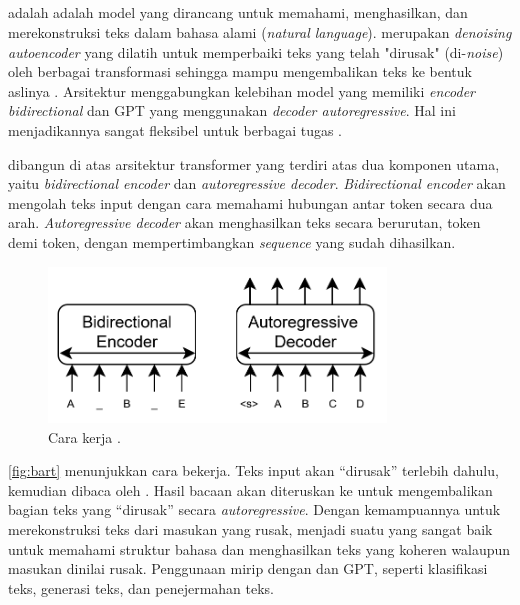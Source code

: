 \subsection{\bartfull}
\label{subsec:bart}

\bartfull adalah adalah model \ml{} yang dirancang untuk memahami, menghasilkan, dan merekonstruksi teks dalam bahasa alami (\emph{natural language}). \bart{} merupakan \emph{denoising autoencoder} yang dilatih untuk memperbaiki teks yang telah "dirusak" (di-\emph{noise}) oleh berbagai transformasi sehingga mampu mengembalikan teks ke bentuk aslinya \parencite{lewis2019bart}. Arsitektur \bart{} menggabungkan kelebihan model \bert{} yang memiliki \emph{encoder bidirectional} dan GPT yang menggunakan \emph{decoder autoregressive}. Hal ini menjadikannya sangat fleksibel untuk berbagai tugas \nlpfull.

\bart{} dibangun di atas arsitektur transformer yang terdiri atas dua 
komponen utama, yaitu \emph{bidirectional encoder} dan \textit{autoregressive decoder}. 
\emph{Bidirectional encoder} akan mengolah teks input dengan cara memahami hubungan antar token secara dua arah. \emph{Autoregressive decoder} akan menghasilkan teks secara berurutan, token demi token, dengan mempertimbangkan \emph{sequence} yang sudah dihasilkan.

\pagebreak

\begin{figure}
\centering
\includegraphics[width=0.8\textwidth]{images/bart.png}
\caption{Cara kerja \bart{} \parencite{lewis2019bart}.}
\label{fig:bart}
\end{figure}

\autoref{fig:bart} menunjukkan cara \bart{} bekerja. Teks input akan “dirusak” terlebih dahulu, kemudian dibaca oleh \encoder. Hasil bacaan \encoder{} akan diteruskan ke \decoder{} untuk mengembalikan bagian teks yang “dirusak” secara 
\textit{autoregressive}. Dengan kemampuannya untuk merekonstruksi teks dari masukan yang rusak, \bart{} menjadi suatu \transformer{} yang sangat baik untuk memahami struktur bahasa dan menghasilkan teks yang koheren walaupun masukan dinilai 
rusak. Penggunaan \bart{} mirip dengan \bert{} dan GPT, seperti klasifikasi teks, generasi teks, dan penejermahan teks. 


